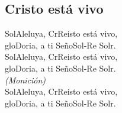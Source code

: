 \subsection{Cristo está vivo}
\begin{center}

{\Large
\ac{Sol}Aleluya, Cr\ac{Re}isto está vivo,\\
glo\ac{Do}ria, a ti Seño\ac{Sol-Re    Sol}r.\\
\vspace{2em}
\ac{Sol}Aleluya, Cr\ac{Re}isto está vivo,\\
glo\ac{Do}ria, a ti Seño\ac{Sol-Re    Sol}r.\\
\vspace{2em}
\textit{(Monición)}\\
\vspace{2em}
\ac{Sol}Aleluya, Cr\ac{Re}isto está vivo,\\
glo\ac{Do}ria, a ti Seño\ac{Sol-Re    Sol}r.\\
\vspace{2em}
}
\end{center}
